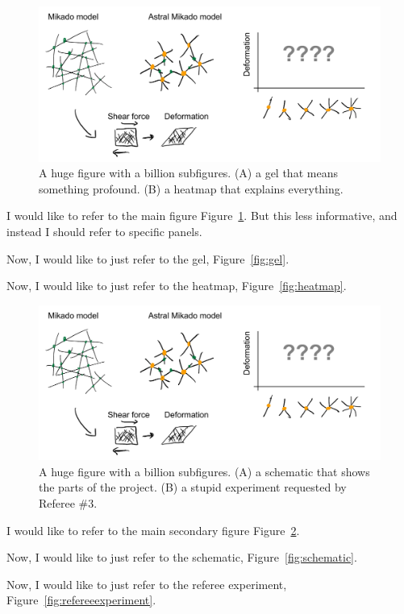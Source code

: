 \documentclass[onecolumn,11pt]{article}
\begin{document}
\begin{figure}[ht]
        \centering
        \includegraphics[width=4.5in]{figures/figJeanJacket.pdf}


        \caption{A huge figure with a billion subfigures. 
        (A) a gel that means something profound. 
        (B) a heatmap that explains everything.}
        \label{fig:main_conclusion}
\end{figure}
    

I would like to refer to the main figure Figure~\ref{fig:main_conclusion}. But this less informative, and instead I should refer to specific panels.

Now, I would like to just refer to the gel, Figure~\ref{fig:gel}.

Now, I would like to just refer to the heatmap, Figure~\ref{fig:heatmap}.




\newpage
\begin{figure}[ht]
        \centering
        \includegraphics[width=4.5in]{figures/figJeanJacket.pdf}
        \caption{A huge figure with a billion subfigures. 
        (A) a schematic that shows the parts of the project. 
        (B) a stupid experiment requested by Referee \#3.}
        \label{fig:secondaryconclusion}
\end{figure}

I would like to refer to the main secondary figure Figure~\ref{fig:secondaryconclusion}.

Now, I would like to just refer to the schematic, Figure~\ref{fig:schematic}.

Now, I would like to just refer to the referee experiment, Figure~\ref{fig:refereeexperiment}.
\end{document}
